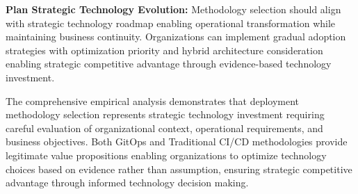 \textbf{Plan Strategic Technology Evolution:}
Methodology selection should align with strategic technology roadmap enabling operational transformation while maintaining business continuity. Organizations can implement gradual adoption strategies with optimization priority and hybrid architecture consideration enabling strategic competitive advantage through evidence-based technology investment.

The comprehensive empirical analysis demonstrates that deployment methodology selection represents strategic technology investment requiring careful evaluation of organizational context, operational requirements, and business objectives. Both GitOps and Traditional CI/CD methodologies provide legitimate value propositions enabling organizations to optimize technology choices based on evidence rather than assumption, ensuring strategic competitive advantage through informed technology decision making.